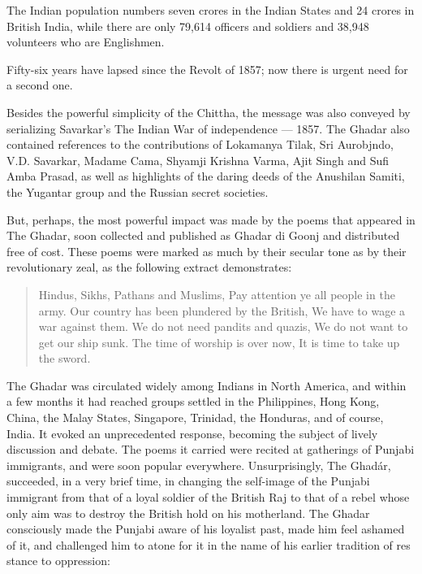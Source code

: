 The Indian population numbers seven crores in the Indian States and 24 crores in British India, while there are only 79,614 officers and soldiers and 38,948 volunteers who are Englishmen.

Fifty-six years have lapsed since the Revolt of 1857; now there is urgent need for a second one.

Besides the powerful simplicity of the Chittha, the message was also conveyed by serializing Savarkar's The Indian War of independence --- 1857. The Ghadar also contained references to the contributions of Lokamanya Tilak, Sri Aurobjndo, V.D. Savarkar, Madame Cama, Shyamji Krishna Varma, Ajit Singh and Sufi Amba Prasad, as well as highlights of the daring deeds of the Anushilan Samiti, the Yugantar group and the Russian secret societies.

But, perhaps, the most powerful impact was made by the poems that appeared in The Ghadar, soon collected and published as Ghadar di Goonj and distributed free of cost. These poems were marked as much by their secular tone as by their revolutionary zeal, as the following extract demonstrates:

\begin{multicols}{2}
\begin{verse}
	Hindus, Sikhs, Pathans and Muslims,
	Pay attention ye all people in the army.
	Our country has been plundered by the British,
	We have to wage a war against them.
	We do not need pandits and quazis,
	We do not want to get our ship sunk.
	The time of worship is over now,
	It is time to take up the sword.
\end{verse}
\end{multicols}

The Ghadar was circulated widely among Indians in North America, and within a few months it had reached groups settled in the Philippines, Hong Kong, China, the Malay States, Singapore, Trinidad, the Honduras, and of course, India. It evoked an unprecedented response, becoming the subject of lively discussion and debate. The poems it carried were recited at gatherings of Punjabi immigrants, and were soon popular everywhere. Unsurprisingly, The Ghadár, succeeded, in a very brief time, in changing the self-image of the Punjabi immigrant from that of a loyal soldier of the British Raj to that of a rebel whose only aim was to destroy the British hold on his motherland. The Ghadar consciously made the Punjabi aware of his loyalist past, made him feel ashamed of it, and challenged him to atone for it in the name of his earlier tradition of res stance to oppression:

